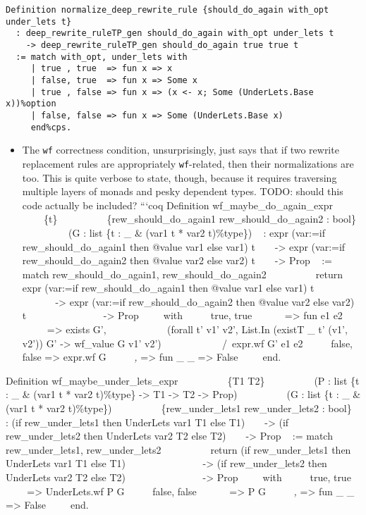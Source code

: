 \begin{itemize}
\begin{verbatim}
Definition normalize_deep_rewrite_rule {should_do_again with_opt under_lets t}
  : deep_rewrite_ruleTP_gen should_do_again with_opt under_lets t
    -> deep_rewrite_ruleTP_gen should_do_again true true t
  := match with_opt, under_lets with
     | true , true  => fun x => x
     | false, true  => fun x => Some x
     | true , false => fun x => (x <- x; Some (UnderLets.Base x))%option
     | false, false => fun x => Some (UnderLets.Base x)
     end%cps.
\end{verbatim}

  \begin{itemize}
  \tightlist
  \item
    The \texttt{wf} correctness condition, unsurprisingly, just says
    that if two rewrite replacement rules are appropriately
    \texttt{wf}-related, then their normalizations are too. This is
    quite verbose to state, though, because it requires traversing
    multiple layers of monads and pesky dependent types. TODO: should
    this code actually be included? ```coq Definition
    wf\_maybe\_do\_again\_expr ~ ~ ~ ~ ~ ~\{t\} ~ ~ ~ ~ ~
    ~\{rew\_should\_do\_again1 rew\_should\_do\_again2 : bool\} ~ ~ ~ ~
    ~ ~(G : list \{t : \_ \& (var1 t * var2 t)\%type\}) ~ : expr
    (var:=if rew\_should\_do\_again1 then @value var1 else var1) t ~ ~
    -\textgreater{} expr (var:=if rew\_should\_do\_again2 then @value
    var2 else var2) t ~ ~ -\textgreater{} Prop ~ := match
    rew\_should\_do\_again1, rew\_should\_do\_again2 ~ ~ ~ ~ ~ ~return
    expr (var:=if rew\_should\_do\_again1 then @value var1 else var1) t
    ~ ~ ~ ~ ~ ~ ~ ~ ~ -\textgreater{} expr (var:=if
    rew\_should\_do\_again2 then @value var2 else var2) t ~ ~ ~ ~ ~ ~ ~
    ~ ~ -\textgreater{} Prop ~ ~ ~with ~ ~ ~\textbar{} true, true ~ ~ ~
    ~=\textgreater{} fun e1 e2 ~ ~ ~ ~ ~ =\textgreater{} exists G', ~ ~
    ~ ~ ~ ~ ~ (forall t' v1' v2', List.In (existT \_ t' (v1', v2')) G'
    -\textgreater{} wf\_value G v1' v2') ~ ~ ~ ~ ~ ~ ~ /~expr.wf G' e1
    e2 ~ ~ ~\textbar{} false, false =\textgreater{} expr.wf G ~ ~
    ~\textbar{} \emph{, } =\textgreater{} fun \_ \_ =\textgreater{}
    False ~ ~ ~end.
  \end{itemize}

  Definition wf\_maybe\_under\_lets\_expr ~ ~ ~ ~ ~ ~\{T1 T2\} ~ ~ ~ ~ ~
  ~(P : list \{t : \_ \& (var1 t * var2 t)\%type\} -\textgreater{} T1
  -\textgreater{} T2 -\textgreater{} Prop) ~ ~ ~ ~ ~ ~(G : list \{t : \_
  \& (var1 t * var2 t)\%type\}) ~ ~ ~ ~ ~ ~\{rew\_under\_lets1
  rew\_under\_lets2 : bool\} ~ : (if rew\_under\_lets1 then UnderLets
  var1 T1 else T1) ~ ~ -\textgreater{} (if rew\_under\_lets2 then
  UnderLets var2 T2 else T2) ~ ~ -\textgreater{} Prop ~ := match
  rew\_under\_lets1, rew\_under\_lets2 ~ ~ ~ ~ ~ ~return (if
  rew\_under\_lets1 then UnderLets var1 T1 else T1) ~ ~ ~ ~ ~ ~ ~ ~ ~
  -\textgreater{} (if rew\_under\_lets2 then UnderLets var2 T2 else T2)
  ~ ~ ~ ~ ~ ~ ~ ~ ~ -\textgreater{} Prop ~ ~ ~with ~ ~ ~\textbar{} true,
  true ~ ~ ~ ~=\textgreater{} UnderLets.wf P G ~ ~ ~\textbar{} false,
  false ~ ~ ~ ~=\textgreater{} P G ~ ~ ~\textbar{} \emph{, }
  =\textgreater{} fun \_ \_ =\textgreater{} False ~ ~ ~end.


\end{itemize}
